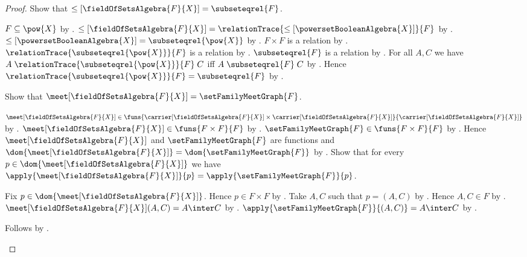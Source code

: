 \begin{proof}
    Show that
        $\leq[\fieldOfSetsAlgebra{F}{X}]=\subseteqrel{F}$.
    \begin{subproof}
        $F\subseteq\pow{X}$ by .
        $\leq[\fieldOfSetsAlgebra{F}{X}]
            =\relationTrace{
                \leq[\powersetBooleanAlgebra{X}]}{F}$ by
            .
        $\leq[\powersetBooleanAlgebra{X}]
            =\subseteqrel{\pow{X}}$ by
            .
        $F\times F$ is a relation by
            .
        $\relationTrace{\subseteqrel{\pow{X}}}{F}$ is a relation by
            .
        $\subseteqrel{F}$ is a relation by .
        For all $A,C$ we have
            $A\mathrel{\relationTrace{
                \subseteqrel{\pow{X}}}{F}}C$ iff
            $A\mathrel{\subseteqrel{F}}C$ by
            .
        Hence $\relationTrace{\subseteqrel{\pow{X}}}{F}
            =\subseteqrel{F}$ by .
    \end{subproof}

    Show that
        $\meet[\fieldOfSetsAlgebra{F}{X}]
            =\setFamilyMeetGraph{F}$.
    \begin{subproof}
        $\meet[\fieldOfSetsAlgebra{F}{X}]
            \in\funs{
                \carrier[\fieldOfSetsAlgebra{F}{X}]
                    \times\carrier[\fieldOfSetsAlgebra{F}{X}]}
                {\carrier[\fieldOfSetsAlgebra{F}{X}]}$ by
            .
        $\meet[\fieldOfSetsAlgebra{F}{X}]
            \in\funs{F\times F}{F}$ by
            .
        $\setFamilyMeetGraph{F}\in\funs{F\times F}{F}$ by
            .
        Hence $\meet[\fieldOfSetsAlgebra{F}{X}]$ and
            $\setFamilyMeetGraph{F}$ are functions and
            $\dom{\meet[\fieldOfSetsAlgebra{F}{X}]}
                =\dom{\setFamilyMeetGraph{F}}$ by
            .
        Show that for every $p\in
            \dom{\meet[\fieldOfSetsAlgebra{F}{X}]}$ we have
            $\apply{\meet[\fieldOfSetsAlgebra{F}{X}]}{p}
                =\apply{\setFamilyMeetGraph{F}}{p}$.
        \begin{subproof}
            Fix $p\in\dom{\meet[\fieldOfSetsAlgebra{F}{X}]}$.
            Hence $p\in F\times F$ by .
            Take $A,C$ such that $p=(A,C)$ by
                .
            Hence $A,C\in F$ by .
            $\meet[\fieldOfSetsAlgebra{F}{X}](A,C)=A\inter C$ by
                .
            $\apply{\setFamilyMeetGraph{F}}{(A,C)}=A\inter C$ by
                .
        \end{subproof}
        Follows by .
    \end{subproof}


\end{proof}
